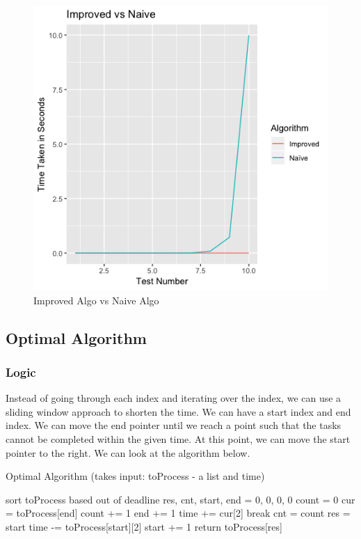 \documentclass[11pt]{article}
\begin{document}
{				\begin{figure}
					\includegraphics[scale=0.5]{ImprovedVsNaive.png}
					\caption{Improved Algo vs Naive Algo}
				\end{figure}
				
				\subsection{Optimal Algorithm}
				\subsubsection{Logic}
				Instead of going through each index and iterating over the index, we can use a sliding window approach to shorten the time. We can have a start index and end index. We can move the end pointer until we reach a point such that the tasks cannot be completed within the given time. At this point, we can move the start pointer to the right. We can look at the algorithm below.
				
				\begin{algorithm}
					\caption{Optimal Algorithm (takes input: toProcess - a list and time)}
					\begin{algorithmic}[1] 
						\STATE sort toProcess based out of deadline
						\STATE res, cnt, start, end = 0, 0, 0, 0
						\STATE count = 0
						\STATE cur = toProcess[end]
						\STATE count += 1
						\STATE end += 1
						\STATE time += cur[2]
						\ELSE
						\STATE break
						\ENDIF
						\ENDWHILE
						\STATE cnt = count
						\STATE res = start
						\ENDIF
						\STATE time -= toProcess[start][2]
						\STATE start += 1
						\ENDWHILE
						\STATE return toProcess[res]
					\end{algorithmic}
				\end{algorithm}
				
}
\end{document}
